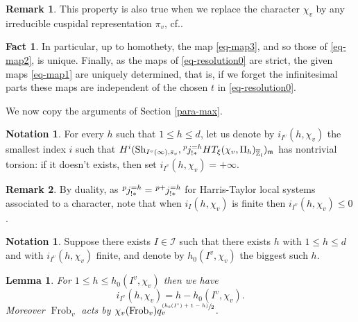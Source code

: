 \documentclass[11pt]{article}
\newcommand{\cf}{cf.\xspace}
\newcommand{\psfrac}[2]{\sfrac{(#1)}{#2}}
\theoremstyle{plain}
\newtheorem{lemma}[equation]{Lemma}
\theoremstyle{definition}
\newtheorem*{remark}{Remark}
\newtheorem{nota}[equation]{Notation}
\newtheorem*{fact}{Fact}
\numberwithin{equation}{subsection}
\newcommand\Zm{{\mathbb Z}}
\newcommand\IC{{\mathcal I}}
\newcommand{\lexp}[2]{\kern \scriptspace \vphantom{#2}^{#1}\kern-\scriptspace#2}
\DeclareMathOperator{\sh}{Sh}
\DeclareMathOperator{\frob}{Frob}
\let \oo=\infty
\begin{document}
\begin{remark}
This property is also true when we replace the character $\chi_v$ by
any irreducible cuspidal representation $\pi_v$, \cf \cite{boyer-duke}.
\end{remark}

\begin{fact}
In particular, up to homothety, the map \eqref{eq-map3}, and so those of \eqref{eq-map2}, is
unique. Finally, as the maps of \eqref{eq-resolution0} are strict, the given maps \eqref{eq-map1}
are uniquely determined, that is, if we forget the infinitesimal parts these maps are independent
of the chosen $t$ in \eqref{eq-resolution0}.
\end{fact}

We now copy the arguments of Section \ref{para-max}.

\begin{nota} \label{nota-ih}
For every $h$ such that $1 \leq h \leq d$, let us denote by $i_{I^v}(h,\chi_v)$ the smallest index $i$
such that
$H^i(\sh_{I^{v}(\oo),\bar s_v},\lexp p j^{=h}_{!*} HT_\xi(\chi_{v},\Pi_h)_{\overline \Zm_l})_{\mathfrak m}$
has nontrivial torsion: if it doesn't exists, then set $i_{I^v}(h,\chi_v)=+\oo$.
\end{nota}

\begin{remark}
By duality, as
$\lexp p j_{!*}^{=h}=\lexp {p+} j^{=h}_{!*}$ for Harris-Taylor local systems
associated to a
character, note that when $i_I(h,\chi_v)$ is finite then $i_{I^v}(h,\chi_v) \leq 0$.
\end{remark}

\begin{nota} \label{nota-h0}
Suppose there exists $I \in \IC$ such that
there exists $h$ with $1 \leq h \leq d$ and with $i_{I^v}(h,\chi_v)$ finite, and denote by
$h_0(I^v,\chi_v)$
the biggest such $h$.
\end{nota}

\begin{lemma} \label{lem-torsion-min}
For $1 \leq h \leq h_0(I^v,\chi_v)$ then we have
\[
i_{I^v}(h,\chi_v)=h-h_0(I^v,\chi_v).
\]
Moreover $\frob_v$ acts by $\chi_v(\frob_v) q_v^{\psfrac{h_0(I^v)+1-h}{2}}$.
\end{lemma}
\end{document}
